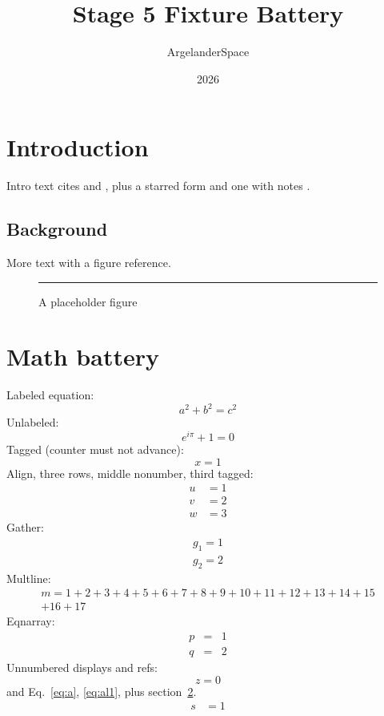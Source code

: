 \documentclass{article}
\title{Stage 5 Fixture Battery}
\author{ArgelanderSpace}
\date{2026}
\begin{document}
\maketitle
\tableofcontents

\section{Introduction}
\label{sec:intro}

Intro text cites \citet{knuth1984texbook} and \citep{lamport1994latex},
plus a starred form \citep*{dijkstra1968letters} and one with notes
\citep[see][chap.~2]{knuth1984texbook}.

\subsection{Background}
\label{sec:background}

More text with a figure reference.

\begin{figure}
  \centering
  \rule{2cm}{1cm}
  \caption{A placeholder figure}
  \label{fig:placeholder}
\end{figure}

\section{Math battery}
\label{sec:math}

Labeled equation:
\begin{equation}\label{eq:a} a^2+b^2=c^2 \end{equation}
Unlabeled:
\begin{equation}
  e^{i\pi}+1=0
\end{equation}
Tagged (counter must not advance):
\begin{equation}
  x=1 \tag{A1}
\end{equation}
Align, three rows, middle nonumber, third tagged:
\begin{align}
  u &= 1 \label{eq:al1} \\
  v &= 2 \nonumber \\
  w &= 3 \tag{X}
\end{align}
Gather:
\begin{gather}
  g_1 = 1 \\
  g_2 = 2
\end{gather}
Multline:
\begin{multline}
  m = 1 + 2 + 3 + 4 + 5 + 6 + 7 + 8 + 9 + 10 + 11 + 12 + 13 + 14 + 15 \\
    + 16 + 17
\end{multline}
Eqnarray:
\begin{eqnarray}
  p &=& 1 \\
  q &=& 2
\end{eqnarray}
Unnumbered displays and refs: \[ z = 0 \] and Eq.~\eqref{eq:a},
\eqref{eq:al1}, plus section~\ref{sec:math}.
\begin{align*} s &= 1 \end{align*}





\end{document}
